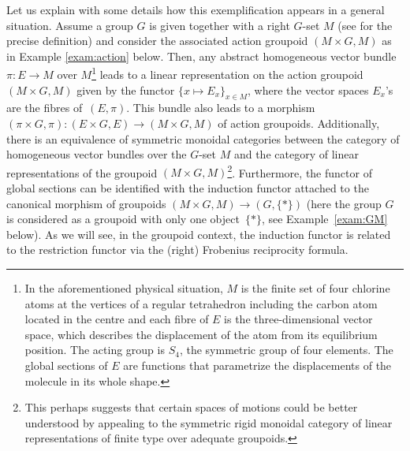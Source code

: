 \documentclass[pdftex]{sigma}
\numberwithin{equation}{section}
\newcommand{\Sscript}[1]{\scriptscriptstyle{#1}}
\begin{document}
Let us explain with some details how this exemplification appears in a general situation. Assume a group $G$ is given together with a right $G$-set $M$ (see \cite{Bouc:2010} for the precise definition) and consider the associated action groupoid $(M\times G, M)$ as in Example \ref{exam:action} below. Then, any abstract homogeneous vector bundle $\pi\colon E \to M$ over $M$\footnote{In the aforementioned physical situation, $M$ is the finite set of four chlorine atoms at the vertices of a regular tetrahedron including the carbon atom located in the centre and each fibre of $E$ is the three-dimensional vector space, which describes the displacement of the atom from its equilibrium position. The acting group is $S_{\Sscript{4}}$, the symmetric group of four elements. The global sections of $E$ are functions that parametrize the displacements of the molecule in its whole shape.} leads to a linear representation on the action groupoid $(M\times G, M)$ given by the functor $\{x \mapsto E_{\Sscript{x}}\}_{\Sscript{x \in M}}$, where the vector spaces $E_x$'s are the fibres of~$(E,\pi)$. This bundle also leads to a morphism $(\pi \times G, \pi)\colon (E \times G, E) \to (M\times G, M)$ of action groupoids. Additionally, there is an equivalence of symmetric monoidal categories between the category of homogeneous vector bundles over the $G$-set $M$ and the category of linear representations of the groupoid $(M\times G, M)$\footnote{This perhaps suggests that certain spaces of motions could be better understood by appealing to the symmetric rigid monoidal category of linear representations of finite type over adequate groupoids.}. Furthermore, the functor of global sections can be identified with the induction functor attached to the canonical morphism of groupoids
$(M\times G, M) \to (G,\{*\})$ (here the group $G$ is considered as a groupoid with only one object~$\{*\}$, see Example~\ref{exam:GM} below). As we will see, in the groupoid context, the induction functor is related to the restriction functor via the (right) Frobenius reciprocity formula.
\end{document}
